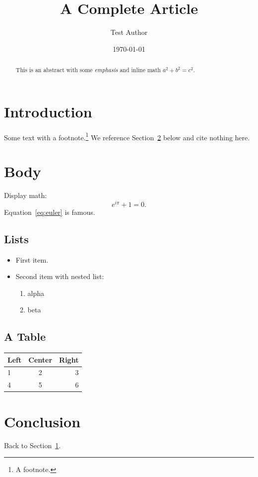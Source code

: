 \documentclass[11pt]{article}
\title{A Complete Article}
\author{Test Author}
\date{\today}
\begin{document}
\maketitle

\begin{abstract}
This is an abstract with some \emph{emphasis} and inline math $a^2+b^2=c^2$.
\end{abstract}

\tableofcontents

\section{Introduction}\label{sec:intro}
Some text with a footnote.\footnote{A footnote.} We reference
Section~\ref{sec:body} below and cite nothing here.

\section{Body}\label{sec:body}
Display math:
\begin{equation}\label{eq:euler}
  e^{i\pi} + 1 = 0.
\end{equation}
Equation~\eqref{eq:euler} is famous.

\subsection{Lists}
\begin{itemize}
  \item First item.
  \item Second item with nested list:
  \begin{enumerate}
    \item alpha
    \item beta
  \end{enumerate}
\end{itemize}

\subsection{A Table}
\begin{center}
\begin{tabular}{lcr}
  \hline
  Left & Center & Right \\
  \hline
  1 & 2 & 3 \\
  4 & 5 & 6 \\
  \hline
\end{tabular}
\end{center}

\section{Conclusion}
Back to Section~\ref{sec:intro}.
\end{document}
